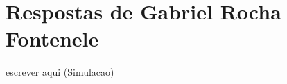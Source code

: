 \section{Respostas de Gabriel Rocha Fontenele\label{tarefa-ngsylar-componentes-experimento}}

escrever aqui (\gls{Simulacao})